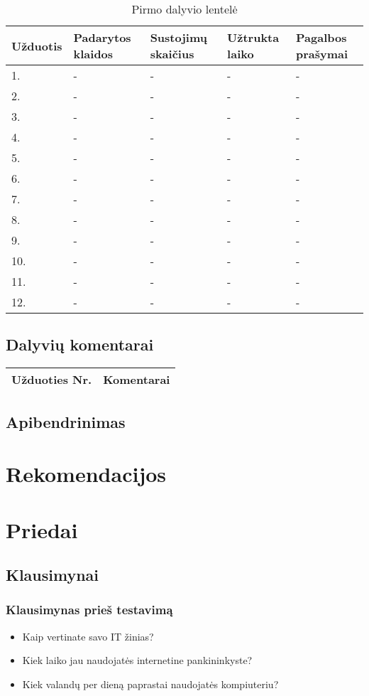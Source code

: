\documentclass[oneside]{VUMIFPSkursinis}
\begin{document}
\begin{center}
	\begin{table}[!pht]
	\caption{Pirmo dalyvio lentelė}
	\begin{tabular}{ |p{1.8cm} | p{3.4cm} | p{3.4cm} | p{2.5cm} | p{3.5cm}|}
	\hline
	Užduotis&Padarytos klaidos&Sustojimų skaičius&Užtrukta laiko&Pagalbos prašymai\\ \hline
1.&-&-&-&- \\ \hline
2.&-&-&-&- \\ \hline
3.&-&-&-&- \\ \hline
4.&-&-&-&- \\ \hline
5.&-&-&-&- \\ \hline
6.&-&-&-&- \\ \hline
7.&-&-&-&- \\ \hline
8.&-&-&-&- \\ \hline
9.&-&-&-&- \\ \hline
10.&-&-&-&- \\ \hline
11.&-&-&-&- \\ \hline
12.&-&-&-&- \\ \hline
\end{tabular}
\end{table}
\vspace{0.7cm}
\end{center}
\subsection{Dalyvių komentarai}
\begin{center}
	\begin{tabular}{ |p{3cm}| p{12cm} |}
	\hline
Užduoties Nr.&Komentarai\\ \hline
	\end{tabular}
\end{center}
\subsection{Apibendrinimas}
\section{Rekomendacijos}
\section{Priedai}
\subsection{Klausimynai}
\subsubsection{Klausimynas prieš testavimą}
\begin{itemize}
	\item Kaip vertinate savo IT žinias?
	\item Kiek laiko jau naudojatės internetine pankininkyste?
	\item Kiek valandų per dieną paprastai naudojatės kompiuteriu?
\end{itemize}
\end{document}
